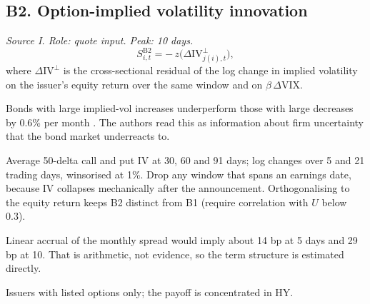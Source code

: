 \documentclass[11pt,letterpaper]{article}
\begin{document}
\subsection{B2. Option-implied volatility innovation}
\emph{Source I. Role: quote input. Peak: 10 days.}
\begin{equation}
S^{\mathrm{B2}}_{i,t}=-\,z\bigl(\Delta\mathrm{IV}^{\perp}_{j(i),t}\bigr),
\end{equation}
where $\Delta\mathrm{IV}^{\perp}$ is the cross-sectional residual of the log change in implied volatility on the issuer's equity return over the same window and on $\beta\,\Delta\mathrm{VIX}$.
\begin{spec}
\item[Mechanism and evidence.] Bonds with large implied-vol increases underperform those with large decreases by 0.6\% per month \cite{cgxz2023}. The authors read this as information about firm uncertainty that the bond market underreacts to.
\item[Build.] Average 50-delta call and put IV at 30, 60 and 91 days; log changes over 5 and 21 trading days, winsorised at 1\%. Drop any window that spans an earnings date, because IV collapses mechanically after the announcement. Orthogonalising to the equity return keeps B2 distinct from B1 (require correlation with $U$ below 0.3).
\item[Horizon.] Linear accrual of the monthly spread would imply about 14 bp at 5 days and 29 bp at 10. That is arithmetic, not evidence, so the term structure is estimated directly.
\item[Coverage.] Issuers with listed options only; the payoff is concentrated in HY.
\end{spec}
\end{document}
